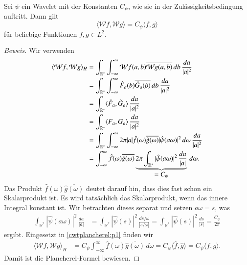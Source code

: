 \begin{satz}
\label{satz:wplancherel}
Sei $\psi$ ein Wavelet mit der Konstanten $C_{\psi}$, wie sie in
der Zulässigkeitsbedingung auftritt.
Dann gilt
\begin{equation}
\langle \mathcal{W}f,\mathcal{W}g\rangle
=
C_{\psi}\langle f,g\rangle
\end{equation}
für beliebige Funktionen $f,g\in L^2$.
\end{satz}

\begin{proof}[Beweis]
Wir verwenden 
\begin{align}
\langle \mathcal{W}f, \mathcal{W}g\rangle_H
&=
\int_{\mathbb R^*} \int_{-\infty}^\infty
\mathcal{W}f (a,b)
\overline{\mathcal{W}g (a,b)} \,db \,\frac{da}{|a|^2}
\notag
\\
&=
\int_{\mathbb R^*} \int_{-\infty}^\infty
\hat{F}_a(b) \overline{\hat{G}_a(b)}\,db\,\frac{da}{|a|^2}
\notag
\\
&=
\int_{\mathbb R^*} 
\langle
\check{F}_a,\check{G}_a
\rangle
\,\frac{da}{|a|^2}
\notag
\\
&=
\int_{\mathbb R^*} \langle F_a, G_a\rangle \,\frac{da}{|a|^2}
\notag
\\
&=
\int_{\mathbb R^*}
\int_{-\infty}^\infty
2\pi |a|\hat{f}(\omega) \overline{\hat{g}(\omega)} |\hat{\psi}(a\omega)|^2
\,d\omega
\,\frac{da}{|a|^2}
\notag
\\
&=
\int_{-\infty}^\infty
\hat{f}(\omega) \overline{\hat{g}(\omega)}
\underbrace{
2\pi
\int_{\mathbb R^*}
|\hat{\psi}(a\omega)|^2
\,\frac{da}{|a|}}_{\displaystyle=C_\psi}
\,d\omega.
\label{cwtplancherel:p1}
\end{align}
Das Produkt $\hat{f}(\omega)\overline{\hat{g}(\omega)}$ deutet darauf hin,
dass dies fast schon ein Skalarprodukt ist.
Es wird tatsächlich das Skalarprodukt, wenn das innere Integral konstant ist.
Wir betrachten dieses separat und setzen $a\omega = s$, was
\begin{align*}
\int_{\mathbb R^*} |\hat{\psi}(a\omega)|^2 \,\frac{da}{|a|}
&=
\int_{\mathbb R^*} |\hat{\psi}(s)|^2 \,\frac{ds/\omega}{|s/\omega|}
=
\int_{\mathbb R^*} |\hat{\psi}(s)|^2 \,\frac{ds}{|s|}
=
\frac{C_{\psi}}{2\pi}
\end{align*}
ergibt.
Eingesetzt in \eqref{cwtplancherel:p1} finden wir
\begin{align*}
\langle \mathcal{W}f, \mathcal{W}g\rangle_H
&=
C_{\psi}
\int_{-\infty}^\infty \hat{f}(\omega)\overline{\hat{g}(\omega)}\,d\omega
=
C_{\psi}
\langle \hat{f},\hat{g}\rangle
=
C_{\psi}
\langle f,g\rangle.
\end{align*}
Damit ist die Plancherel-Formel bewiesen.
\end{proof}

